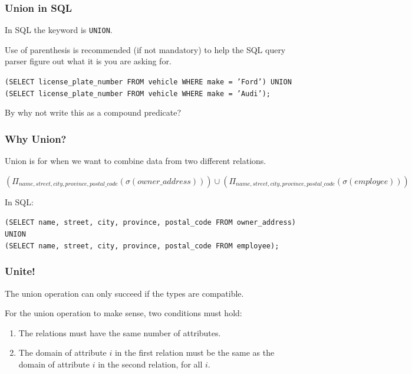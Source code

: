 \begin{frame}
\frametitle{Union in SQL}

In SQL the keyword is \texttt{UNION}. 

Use of parenthesis is recommended (if not mandatory) to help the SQL query parser figure out what it is you are asking for.


\texttt{(SELECT license\_plate\_number FROM vehicle WHERE make = 'Ford') UNION (SELECT license\_plate\_number FROM vehicle WHERE make = 'Audi');}

By why not write this as a compound predicate?

\end{frame}



\begin{frame}
\frametitle{Why Union?}

Union is for when we want to combine data from two different relations.


$(\Pi_{name, street, city, province, postal\_code}(\sigma( owner\_address) )) \cup  (\Pi_{name, street, city, province, postal\_code}(\sigma( employee ) ))$

In SQL:

\texttt{(SELECT name, street, city, province, postal\_code FROM owner\_address)\\ 
UNION\\ 
(SELECT name, street, city, province, postal\_code FROM employee);}


\end{frame}



\begin{frame}
\frametitle{Unite!}

The union operation can only succeed if the types are compatible. 

For the union operation to make sense, two conditions must hold:

\begin{enumerate}
	\item The relations must have the same number of attributes.
	\item The domain of attribute $i$ in the first relation must be the same as the domain of attribute $i$ in the second relation, for all $i$. 
\end{enumerate}

\end{frame}



